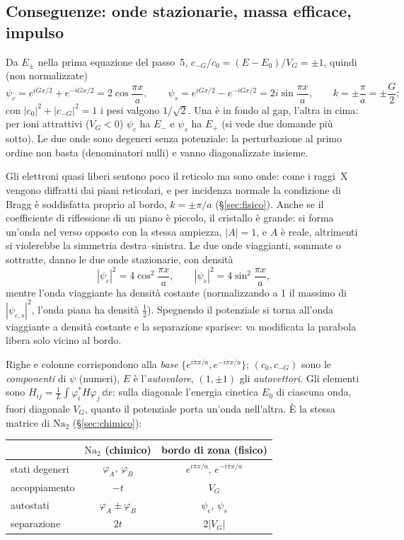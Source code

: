 \documentclass[11pt,a4paper]{article}
\begin{document}
\subsection{Conseguenze: onde stazionarie, massa efficace, impulso}\label{sec:onde}\label{sec:vicino}\label{sec:vg}
Da $E_\pm$ nella prima equazione del passo~5, $c_{-G}/c_0=(E-E_0)/V_G=\pm1$, quindi (non normalizzate)
\[
\psi_c=e^{iGx/2}+e^{-iGx/2}=2\cos\frac{\pi x}a,\qquad\psi_s=e^{iGx/2}-e^{-iGx/2}=2i\sin\frac{\pi x}a,\qquad k=\pm\frac\pi a=\pm\frac G2 ;
\]
con $|c_0|^2+|c_{-G}|^2=1$ i pesi valgono $1/\sqrt2$. Una è in fondo al gap, l'altra in cima: per ioni attrattivi ($V_G<0$) $\psi_c$ ha $E_-$ e $\psi_s$ ha $E_+$ (si vede due domande più
sotto). Le due onde sono degeneri senza potenziale: la perturbazione al primo ordine non basta (denominatori nulli) e vanno diagonalizzate insieme.

Gli elettroni quasi liberi sentono poco il reticolo ma sono onde: come i raggi~X vengono diffratti dai piani reticolari, e per incidenza normale la
condizione di Bragg è soddisfatta proprio al bordo, $k=\pm\pi/a$ (§\ref{sec:fisico}). Anche se il coefficiente di riflessione di un piano è piccolo,
il cristallo è grande: si forma un'onda nel verso opposto con la stessa ampiezza, $|A|=1$, e $A$ è reale, altrimenti si violerebbe la simmetria
destra--sinistra. Le due onde viaggianti, sommate o sottratte, danno le due onde stazionarie, con densità
\[
|\psi_c|^2=4\cos^2\frac{\pi x}a,\qquad|\psi_s|^2=4\sin^2\frac{\pi x}a ,
\]
mentre l'onda viaggiante ha densità costante (normalizzando a 1 il massimo di $|\psi_{c,s}|^2$, l'onda piana ha densità $\frac12$). Spegnendo il
potenziale si torna all'onda viaggiante a densità costante e la separazione sparisce: va modificata la parabola libera solo vicino al bordo.

Righe e colonne corrispondono alla \emph{base} $\{e^{i\pi x/a},e^{-i\pi x/a}\}$; $(c_0,c_{-G})$ sono le
\emph{componenti} di $\psi$ (numeri), $E$ è l'\emph{autovalore}, $(1,\pm1)$ gli \emph{autovettori}. Gli elementi sono
$H_{ij}=\frac1L\int\varphi_i^*H\varphi_j\,\dd x$: sulla diagonale l'energia cinetica $E_0$ di ciascuna onda, fuori diagonale $V_G$, quanto il potenziale porta
un'onda nell'altra. È la stessa matrice di $\mathrm{Na_2}$ (§\ref{sec:chimico}):
\begin{center}\small
\begin{tabular}{@{}lcc@{}}
\toprule
& $\mathrm{Na_2}$ (chimico) & bordo di zona (fisico)\\
\midrule
stati degeneri & $\varphi_A$, $\varphi_B$ & $e^{i\pi x/a}$, $e^{-i\pi x/a}$\\
accoppiamento & $-t$ & $V_G$\\
autostati & $\varphi_A\pm\varphi_B$ & $\psi_c$, $\psi_s$\\
separazione & $2t$ & $2|V_G|$\\
\bottomrule
\end{tabular}
\end{center}
\end{document}
